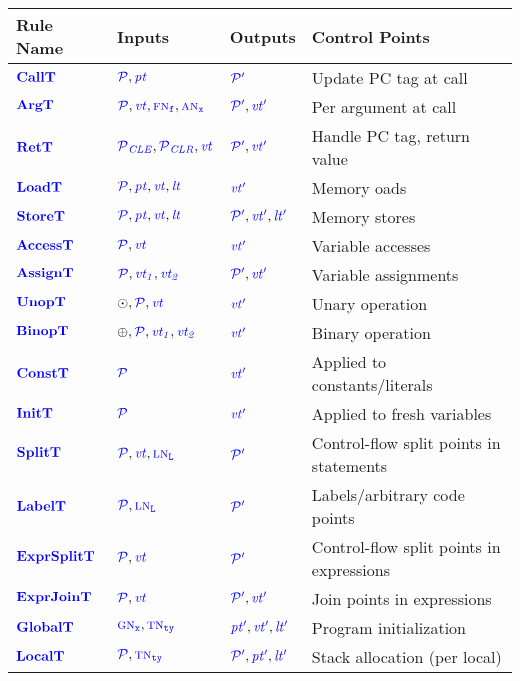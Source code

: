 \documentclass{llncs}
\begin{document}
\begin{table}[t]
  \begin{tabular}{|l|l|l|l|}
    \hline
    Rule Name & Inputs & Outputs & Control Points \\
    \hline
    \(\calltname\)      & \(\calltargs\)         & \(\calltres\)      & Update PC tag at call \\
    \(\argtname\)       & \(\argtargs\)          & \(\argtres\)       & Per argument at call \\
    \(\rettname\)       & \(\rettargs\)          & \(\rettres\)       & Handle PC tag, return value \\
    \(\loadtname\)      & \(\loadtargs\)         & \(\loadtres\)      & Memory oads \\
    \(\storetname\)     & \(\storetargs\)        & \(\storetres\)     & Memory stores \\
    \(\accesstname\)    & \(\accesstargs\)       & \(\accesstres\)    & Variable accesses \\
    \(\assigntname\)    & \(\assigntargs\)       & \(\assigntres\)    & Variable assignments \\
    \(\unoptname\)      & \(\unoptargs\)         & \(\unoptres\)      & Unary operation \\
    \(\binoptname\)     & \(\binoptargs\)        & \(\binoptres\)     & Binary operation \\
    \(\consttname\)     & \(\consttargs\)        & \(\consttres\)     & Applied to constants/literals \\
    \(\inittname\)      & \(\inittargs\)         & \(\inittres\)      & Applied to fresh variables \\
    \(\splittname\)     & \(\splittargs\)        & \(\splittres\)     & Control-flow split points in statements\\
    \(\labeltname\)     & \(\labeltargs\)        & \(\labeltres\)     & Labels/arbitrary code points \\
    \(\exprsplittname\) & \(\exprsplittargs\)    & \(\exprsplittres\) & Control-flow split points in expressions \\
    \(\exprjointname\)  & \(\exprjointargs\)     & \(\exprjointres\)  & Join points in expressions \\
    \(\globaltname\)    & \(\globaltargs\)       & \(\globaltres\)    & Program initialization \\
    \(\localtname\)     & \(\localtargs\)        & \(\localtres\)     & Stack allocation (per local) \\

\end{tabular}
\end{table}
\end{document}
